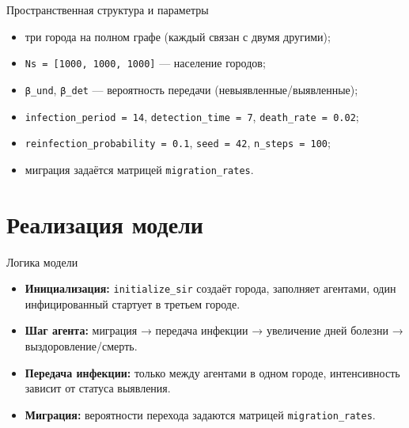 \documentclass[
  ignorenonframetext,
  aspectratio=169,
  russian,
]{beamer}
\providecommand{\tightlist}{%
  \setlength{\itemsep}{0pt}\setlength{\parskip}{0pt}}
\begin{document}
\begin{frame}[fragile]{Пространственная структура и параметры}
\protect{}\label{ux43fux440ux43eux441ux442ux440ux430ux43dux441ux442ux432ux435ux43dux43dux430ux44f-ux441ux442ux440ux443ux43aux442ux443ux440ux430-ux438-ux43fux430ux440ux430ux43cux435ux442ux440ux44b}
\begin{itemize}[<+->]
\tightlist
\item
  три города на полном графе (каждый связан с двумя другими);
\item
  \texttt{Ns\ =\ {[}1000,\ 1000,\ 1000{]}} --- население городов;
\item
  \texttt{β\_und}, \texttt{β\_det} --- вероятность передачи
  (невыявленные/выявленные);
\item
  \texttt{infection\_period\ =\ 14}, \texttt{detection\_time\ =\ 7},
  \texttt{death\_rate\ =\ 0.02};
\item
  \texttt{reinfection\_probability\ =\ 0.1}, \texttt{seed\ =\ 42},
  \texttt{n\_steps\ =\ 100};
\item
  миграция задаётся матрицей \texttt{migration\_rates}.
\end{itemize}
\end{frame}

\section{Реализация
модели}\label{ux440ux435ux430ux43bux438ux437ux430ux446ux438ux44f-ux43cux43eux434ux435ux43bux438}

\begin{frame}[fragile]{Логика модели}
\protect{}\label{ux43bux43eux433ux438ux43aux430-ux43cux43eux434ux435ux43bux438}
\begin{itemize}[<+->]
\tightlist
\item
  \textbf{Инициализация:} \texttt{initialize\_sir} создаёт города,
  заполняет агентами, один инфицированный стартует в третьем городе.
\item
  \textbf{Шаг агента:} миграция → передача инфекции → увеличение дней
  болезни → выздоровление/смерть.
\item
  \textbf{Передача инфекции:} только между агентами в одном городе,
  интенсивность зависит от статуса выявления.
\item
  \textbf{Миграция:} вероятности перехода задаются матрицей
  \texttt{migration\_rates}.
\end{itemize}
\end{frame}
\end{document}
